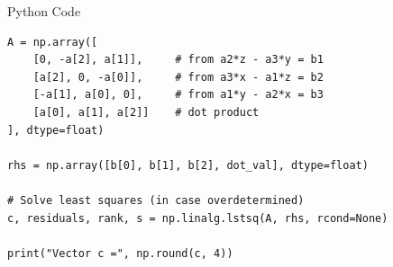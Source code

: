 \documentclass{beamer}
\begin{document}
\begin{frame}[fragile]{Python Code}
    \begin{verbatim}
A = np.array([
    [0, -a[2], a[1]],     # from a2*z - a3*y = b1
    [a[2], 0, -a[0]],     # from a3*x - a1*z = b2
    [-a[1], a[0], 0],     # from a1*y - a2*x = b3
    [a[0], a[1], a[2]]    # dot product
], dtype=float)

rhs = np.array([b[0], b[1], b[2], dot_val], dtype=float)

# Solve least squares (in case overdetermined)
c, residuals, rank, s = np.linalg.lstsq(A, rhs, rcond=None)

print("Vector c =", np.round(c, 4))
    \end{verbatim}
\end{frame}
\end{document}
